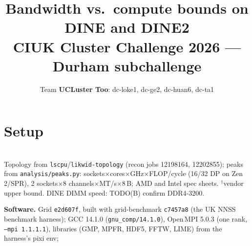 \documentclass[9pt,a4paper,twocolumn]{extarticle}
\title{\vspace{-1.2cm}\textbf{Bandwidth vs.\ compute bounds on DINE and DINE2}\\
\large CIUK Cluster Challenge 2026 --- Durham subchallenge}
\author{Team \textbf{UCLuster Too}: dc-loke1, dc-ge2, dc-huan6, dc-ta1}
\date{\vspace{-0.8cm}}
\begin{document}
\maketitle


\section{Setup}            %
\begin{table}[h]\centering\small\setlength{\tabcolsep}{3pt}
\caption{Nodes (one exclusive node per job). Peaks per node at base / max-turbo clock; DINE2
DIMM speed and all-core clock unverified, so its values are vendor upper bounds.}
\label{tab:hw}
\\[1pt]
{\footnotesize Topology from \texttt{lscpu}/\texttt{likwid-topology} (recon jobs 12198164, 12202855);
peaks from \texttt{analysis/peaks.py}: sockets$\times$cores$\times$GHz$\times$FLOP/cycle (16/32 DP on
Zen\,2/SPR), 2 sockets$\times$8 channels$\times$MT/s$\times$8\,B; AMD and Intel spec sheets. $^\dagger$vendor upper bound.
DINE DIMM speed: TODO(B) confirm DDR4-3200.}
\end{table}
\textbf{Software.} Grid \texttt{e2d607f}, built with grid-benchmark \texttt{c7457a8} (the UK NNSS
benchmark harness); GCC 14.1.0 (\texttt{gnu\_comp/14.1.0}), Open\,MPI 5.0.3 (one rank,
\texttt{--mpi 1.1.1.1}), libraries (GMP, MPFR, HDF5, FFTW, LIME) from the harness's pixi env;
\end{document}
